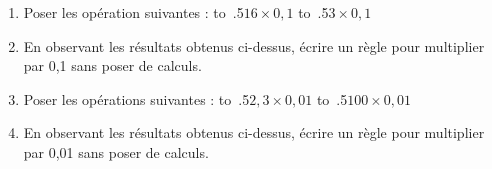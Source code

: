 \documentclass[activite]{thedocument}
\begin{document}
    \begin{enumerate}
        \item Poser les opération suivantes :\vskip10pt
        \hskip0pt\hbox{\hbox to .5$16\times0,1$}\vskip5pt
        \hskip0pt\hbox{\hbox to .5$3\times0,1$}
        \item En observant les résultats obtenus ci-dessus, écrire un règle
        pour multiplier par 0,1 sans poser de calculs.
        \dotedline
        \item Poser les opérations suivantes :\vskip10pt
        \hskip0pt\hbox{\hbox to .5$2,3\times0,01$}\vskip5pt
        \hskip0pt\hbox{\hbox to .5$100\times0,01$}
        \item En observant les résultats obtenus ci-dessus, écrire un règle
        pour multiplier par 0,01 sans poser de calculs.
        \dotedline
    \end{enumerate}
\end{document}
